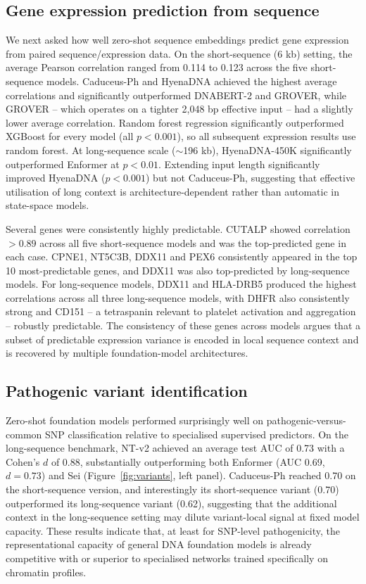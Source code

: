 \documentclass[11pt,a4paper]{article}
\begin{document}
\subsection{Gene expression prediction from sequence}
We next asked how well zero-shot sequence embeddings predict gene expression from paired sequence/expression data. On the short-sequence (6 kb) setting, the average Pearson correlation ranged from 0.114 to 0.123 across the five short-sequence models. Caduceus-Ph and HyenaDNA achieved the highest average correlations and significantly outperformed DNABERT-2 and GROVER, while GROVER -- which operates on a tighter 2{,}048 bp effective input -- had a slightly lower average correlation. Random forest regression significantly outperformed XGBoost for every model (all $p < 0.001$), so all subsequent expression results use random forest. At long-sequence scale ($\sim$196 kb), HyenaDNA-450K significantly outperformed Enformer at $p < 0.01$. Extending input length significantly improved HyenaDNA ($p < 0.001$) but not Caduceus-Ph, suggesting that effective utilisation of long context is architecture-dependent rather than automatic in state-space models.

Several genes were consistently highly predictable. CUTALP showed correlation $> 0.89$ across all five short-sequence models and was the top-predicted gene in each case. CPNE1, NT5C3B, DDX11 and PEX6 consistently appeared in the top 10 most-predictable genes, and DDX11 was also top-predicted by long-sequence models. For long-sequence models, DDX11 and HLA-DRB5 produced the highest correlations across all three long-sequence models, with DHFR also consistently strong and CD151 -- a tetraspanin relevant to platelet activation and aggregation -- robustly predictable. The consistency of these genes across models argues that a subset of predictable expression variance is encoded in local sequence context and is recovered by multiple foundation-model architectures.

\subsection{Pathogenic variant identification}
Zero-shot foundation models performed surprisingly well on pathogenic-versus-common SNP classification relative to specialised supervised predictors. On the long-sequence benchmark, NT-v2 achieved an average test AUC of 0.73 with a Cohen's $d$ of 0.88, substantially outperforming both Enformer (AUC 0.69, $d = 0.73$) and Sei (Figure~\ref{fig:variants}, left panel). Caduceus-Ph reached 0.70 on the short-sequence version, and interestingly its short-sequence variant (0.70) outperformed its long-sequence variant (0.62), suggesting that the additional context in the long-sequence setting may dilute variant-local signal at fixed model capacity. These results indicate that, at least for SNP-level pathogenicity, the representational capacity of general DNA foundation models is already competitive with or superior to specialised networks trained specifically on chromatin profiles.
\end{document}
